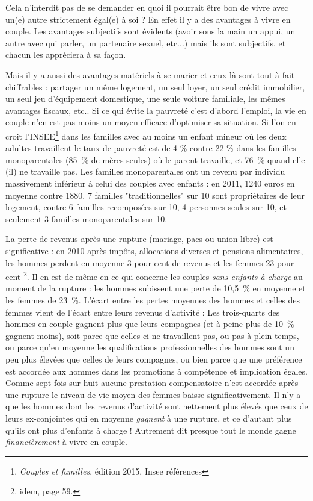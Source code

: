 {Cela n'interdit pas de se demander en quoi il pourrait être bon de vivre avec un(e) autre strictement égal(e) à soi ? En effet il y a des avantages à vivre en couple. Les avantages subjectifs sont évidents (avoir sous la main un appui, un autre avec qui parler, un partenaire sexuel, etc...) mais ils sont subjectifs, et chacun les appréciera à sa façon. 

Mais il y a aussi des avantages matériels à se marier et ceux-là sont tout à fait chiffrables : partager un même logement, un seul loyer, un seul crédit immobilier, un seul jeu d'équipement domestique, une seule voiture familiale, les mêmes avantages fiscaux, etc.. Si ce qui évite la pauvreté c'est d'abord l'emploi, la vie en couple n'en est pas moins un moyen efficace d'optimiser sa situation. Si l'on en croit l'INSEE\footnote{\emph{Couples et familles}, édition 2015, Insee références} dans les familles avec au moins un enfant mineur où les deux adultes travaillent le taux de pauvreté est de 4 \% contre 22 \% dans les familles monoparentales (85~\% de mères seules) où le parent travaille, et 76~\% quand elle (il) ne travaille pas. Les familles monoparentales ont un revenu par individu massivement inférieur à celui des couples avec enfants : en 2011, 1240 euros en moyenne contre 1880. 7 familles "traditionnelles" sur 10 sont propriétaires de leur logement, contre 6 familles recomposées sur 10, 4 personnes seules sur 10, et seulement 3 familles monoparentales sur 10. 

La perte de revenus après une rupture (mariage, pacs ou union libre) est significative  : en 2010 après impôts, allocations diverses et pensions alimentaires, les hommes perdent en moyenne 3 pour cent de revenus et les femmes 23 pour cent \footnote{idem, page 59.}. Il en est de même en ce qui concerne les couples \emph{sans enfants à charge} au moment de la rupture  :  les hommes subissent une perte de 10,5~\% en moyenne et les femmes de 23~\%. L'écart entre les pertes moyennes des hommes et celles des femmes vient de l'écart entre leurs revenus d'activité : Les trois-quarts des hommes en couple gagnent plus que leurs compagnes (et à peine plus de 10~\% gagnent moins), soit parce que celles-ci ne travaillent pas, ou pas à plein temps, ou parce qu'en moyenne les qualifications professionnelles des hommes sont un peu plus élevées que celles de leurs compagnes, ou bien parce que une préférence est accordée aux hommes dans les promotions à compétence et implication égales. Comme sept fois sur huit aucune prestation compensatoire n'est accordée après une rupture le niveau de vie moyen des femmes baisse significativement. Il n'y a que les hommes dont les revenus d'activité sont nettement plus élevés que ceux de leurs ex-conjointes qui en moyenne \emph{gagnent} à une rupture, et ce d'autant plus qu'ils ont plus d'enfants à charge ! Autrement dit presque tout le monde gagne \emph{financièrement} à vivre en couple. 

}
